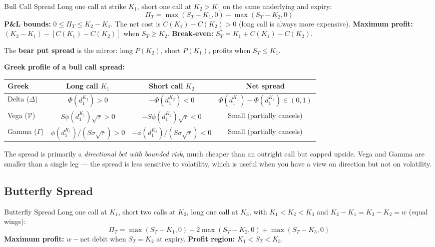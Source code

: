 \documentclass[12pt,a4paper,openany]{report}
\theoremstyle{definition}
\begin{document}
\begin{definitionbox}{Bull Call Spread}
Long one call at strike $K_1$, short one call at $K_2 > K_1$ on the same underlying and expiry:
\[
  \Pi_T = \max(S_T - K_1, 0) - \max(S_T - K_2, 0)
\]
\textbf{P\&L bounds:} $0 \leq \Pi_T \leq K_2 - K_1$.
The net cost is $C(K_1) - C(K_2) > 0$ (long call is always more expensive).
\textbf{Maximum profit:} $(K_2 - K_1) - [C(K_1) - C(K_2)]$ when $S_T \geq K_2$.
\textbf{Break-even:} $S_T^* = K_1 + C(K_1) - C(K_2)$.
\end{definitionbox}

The \textbf{bear put spread} is the mirror: long $P(K_2)$, short $P(K_1)$, profits when $S_T \leq K_1$.

\textbf{Greek profile of a bull call spread:}
\begin{center}
\begin{tabular}{lccc}
\toprule
\textbf{Greek} & \textbf{Long call $K_1$} & \textbf{Short call $K_2$} & \textbf{Net spread} \\
\midrule
Delta ($\Delta$) & $\Phi(d_1^{K_1}) > 0$ & $-\Phi(d_1^{K_2}) < 0$ & $\Phi(d_1^{K_1}) - \Phi(d_1^{K_2}) \in (0,1)$ \\
Vega ($\mathcal{V}$) & $S\phi(d_1^{K_1})\sqrt{\tau} > 0$ & $-S\phi(d_1^{K_2})\sqrt{\tau} < 0$ & Small (partially cancels) \\
Gamma ($\Gamma$) & $\phi(d_1^{K_1})/(S\sigma\sqrt{\tau}) > 0$ & $-\phi(d_1^{K_2})/(S\sigma\sqrt{\tau}) < 0$ & Small (partially cancels) \\
\bottomrule
\end{tabular}
\end{center}
The spread is primarily a \emph{directional bet with bounded risk}, much cheaper than an outright call but capped upside. Vega and Gamma are smaller than a single leg — the spread is less sensitive to volatility, which is useful when you have a view on direction but not on volatility.

\subsection{Butterfly Spread}

\begin{definitionbox}{Butterfly Spread}
Long one call at $K_1$, short two calls at $K_2$, long one call at $K_3$, with $K_1 < K_2 < K_3$ and $K_2 - K_1 = K_3 - K_2 = w$ (equal wings):
\[
  \Pi_T = \max(S_T - K_1, 0) - 2\max(S_T - K_2, 0) + \max(S_T - K_3, 0)
\]
\textbf{Maximum profit:} $w - \text{net debit}$ when $S_T = K_2$ at expiry.
\textbf{Profit region:} $K_1 < S_T < K_3$.
\end{definitionbox}
\end{document}
